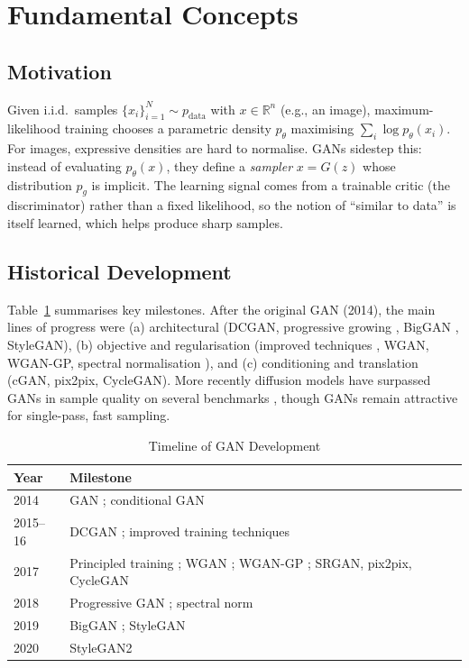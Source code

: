 \documentclass[conference]{IEEEtran}
\newcommand{\pdata}{p_{\mathrm{data}}}
\newcommand{\pg}{p_{g}}
\theoremstyle{plain}
\theoremstyle{definition}
\begin{document}
\section{Fundamental Concepts}\label{sec:fund}

\subsection{Motivation}
Given i.i.d.\ samples $\{x_i\}_{i=1}^{N}\sim\pdata$ with $x\in\mathbb{R}^n$ (e.g., an image), maximum-likelihood training chooses a parametric density $p_\theta$ maximising $\sum_i\log p_\theta(x_i)$. For images, expressive densities are hard to normalise. GANs sidestep this: instead of evaluating $p_\theta(x)$, they define a \emph{sampler} $x=G(z)$ whose distribution $\pg$ is implicit. The learning signal comes from a trainable critic (the discriminator) rather than a fixed likelihood, so the notion of ``similar to data'' is itself learned, which helps produce sharp samples.

\subsection{Historical Development}
Table~\ref{tab:history} summarises key milestones. After the original GAN (2014), the main lines of progress were (a) architectural (DCGAN, progressive growing \cite{karras2018progan}, BigGAN \cite{brock2019biggan}, StyleGAN), (b) objective and regularisation (improved techniques \cite{salimans2016improved}, WGAN, WGAN-GP, spectral normalisation \cite{miyato2018spectral}), and (c) conditioning and translation (cGAN, pix2pix, CycleGAN). More recently diffusion models have surpassed GANs in sample quality on several benchmarks \cite{dhariwal2021diffusion}, though GANs remain attractive for single-pass, fast sampling.

\begin{table}[t]
\centering
\caption{Timeline of GAN Development}
\label{tab:history}
\footnotesize
\begin{tabular}{@{}p{0.9cm}p{6.3cm}@{}}
\toprule
\textbf{Year} & \textbf{Milestone} \\
\midrule
2014 & GAN \cite{goodfellow2014gan}; conditional GAN \cite{mirza2014cgan} \\
2015--16 & DCGAN \cite{radford2016dcgan}; improved training techniques \cite{salimans2016improved} \\
2017 & Principled training \cite{arjovsky2017principled}; WGAN \cite{arjovsky2017wgan}; WGAN-GP \cite{gulrajani2017wgangp}; SRGAN, pix2pix, CycleGAN \cite{ledig2017srgan,isola2017pix2pix,zhu2017cyclegan} \\
2018 & Progressive GAN \cite{karras2018progan}; spectral norm \cite{miyato2018spectral} \\
2019 & BigGAN \cite{brock2019biggan}; StyleGAN \cite{karras2019stylegan} \\
2020 & StyleGAN2 \cite{karras2020stylegan2} \\
\bottomrule
\end{tabular}
\end{table}
\end{document}
